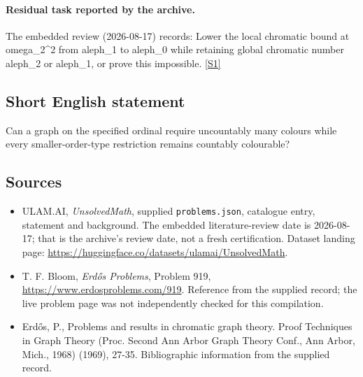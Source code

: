 \documentclass[11pt,a4paper]{article}
\newcommand{\sref}[2]{\hyperlink{source:#1:#2}{[S#2]}}
\begin{document}
\paragraph{Residual task reported by the archive.}

The embedded review (2026-08-17) records: Lower the local chromatic bound at omega\_2\textasciicircum{}2 from aleph\_1 to aleph\_0 while retaining global chromatic number aleph\_2 or aleph\_1, or prove this impossible. \sref{statement}{1}

\subsection{Short English statement}

Can a graph on the specified ordinal require uncountably many colours while every smaller-order-type restriction remains countably colourable?

\subsection{Sources}

{\small

\begin{itemize}

\item[\hypertarget{source:statement:1}{S1}] ULAM.AI, \emph{UnsolvedMath}, supplied \texttt{problems.json}, catalogue entry, statement and background. The embedded literature-review date is 2026-08-17; that is the archive’s review date, not a fresh certification. Dataset landing page: \url{https://huggingface.co/datasets/ulamai/UnsolvedMath}.

\item[\hypertarget{source:statement:2}{S2}] T. F. Bloom, \emph{Erdős Problems}, Problem 919, \url{https://www.erdosproblems.com/919}. Reference from the supplied record; the live problem page was not independently checked for this compilation.

\item[\hypertarget{source:statement:3}{S3}] Erd\H{o}s, P., Problems and results in chromatic graph theory. Proof Techniques in Graph Theory (Proc. Second Ann Arbor Graph Theory Conf., Ann Arbor, Mich., 1968) (1969), 27-35. Bibliographic information from the supplied record.

\end{itemize}

}

\label{end:statement}
\end{document}
